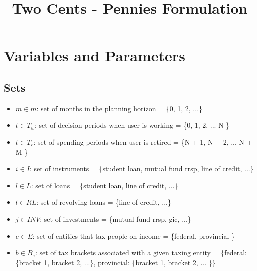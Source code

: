 \documentclass[11pt]{article}
\title{Two Cents - Pennies Formulation}
\begin{document}
\maketitle
\section{Variables and Parameters}
\subsection{Sets}
\begin{itemize}
    \item $m \in m$: set of months in the planning horizon = \{0, 1, 2, ...\}
    \item $t \in T_w$: set of decision periods when user is working = \{0, 1, 2, ... N \}
    \item $t \in T_r$: set of spending periods when user is retired = \{N + 1, N + 2, ... N + M \}
    \item $i \in I$: set of instruments = \{student loan, mutual fund rrsp, line of credit, ...\}
    \item $l \in L$: set of loans = \{student loan, line of credit, ...\}
    \item $l \in RL$: set of revolving loans = \{line of credit, ...\}
    \item $j \in INV$: set of investments = \{mutual fund rrsp, gic, ...\}
    \item $e \in E$: set of entities that tax people on income = \{federal, provincial \}
    \item $b \in B_e$: set of tax brackets associated with a given taxing entity = \{federal: \{bracket 1, bracket 2, ...\}, provincial: \{bracket 1, bracket 2, ... \}\}
\end{itemize}
\end{document}
